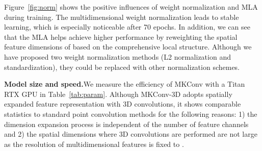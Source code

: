 \documentclass[preprint,12pt]{elsarticle}
\begin{document}
Figure~\ref{fig:norm} shows the positive influences of weight normalization and MLA during training. The multidimensional weight normalization leads to stable learning, which is especially noticeable after 70 epochs. In addition, we can see that the MLA helps achieve higher performance by reweighting the spatial feature dimensions of  based on the comprehensive local structure. Although we have proposed two weight normalization methods (L2 normalization and standardization), they could be replaced with other normalization schemes.


\begin{table}[t]
	\begin{center}
		\caption{Number of parameters and latency for object classification.}
		\scriptsize
		\label{tab:param}\end{center}
\vspace{-0.7cm}
\end{table}

\medskip
\noindent\textbf{Model size and speed.}\hspace{0.3cm}We measure the efficiency of MKConv with a Titan RTX GPU in Table~\ref{tab:param}. Although MKConv-3D adopts spatially expanded feature representation with 3D convolutions, it shows comparable statistics to standard point convolution methods for the following reasons: 1) the dimension expansion process is independent of the number of feature channels and 2) the spatial dimensions where 3D convolutions are performed are not large as the resolution of multidimensional features  is fixed to .
\end{document}
